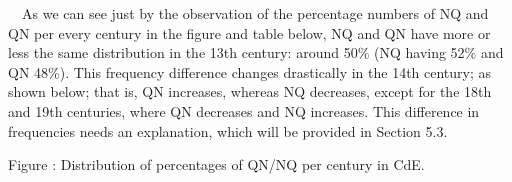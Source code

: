 \begin{styleStandard}
\ \ As we can see just by the observation of the percentage numbers of NQ and QN per every century in the figure and table below, NQ and QN have more or less the same distribution in the 13th century: around 50\% (NQ having 52\% and QN 48\%). This frequency difference changes drastically in the 14th century; as shown below; that is, QN increases, whereas NQ decreases, except for the 18th and 19th centuries, where QN decreases and NQ increases. This difference in frequencies needs an explanation, which will be provided in Section 5.3.
\end{styleStandard}

\begin{stylecaption}
\textmd{Figure : Distribution of percentages of QN/NQ per century in CdE.}
\end{stylecaption}

